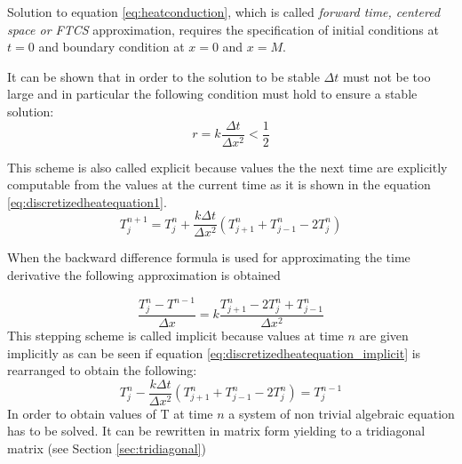 Solution to equation \ref{eq:heatconduction}, which is called \textit{forward time, centered space or FTCS} approximation, requires the specification of initial conditions at $t=0$ and boundary condition at $x=0$ and $x=M$.

It can be shown that in order to the solution to be stable $\Delta t$ must not be too large and in particular the following condition must hold to ensure a stable solution:
\[ 
 r= k \frac{\Delta t}{\Delta x^2}< \frac{1}{2}
\]

This scheme is also called explicit because values the the next time are explicitly computable from the values at the current time as it is shown in the equation \ref{eq:discretizedheatequation1}.
 \begin{equation}
  T^{n+1}_{j} = T^n_{j} + \frac{k \Delta t}{\Delta x^2} (T^n_{j+1}+T^n_{j-1}-2T^n_{j})
 \label{eq:discretizedheatequation1}
 \end{equation}

When the backward difference formula is used for approximating the time derivative the following approximation is obtained

 \begin{equation}
  \frac{T^{n}_{j} - T^{n-1}_{}}{\Delta x} = k \frac{T^n_{j+1}- 2T^n_{j} + T^n_{j-1}}{\Delta x^2}
 \label{eq:discretizedheatequation_implicit}
 \end{equation}
 This stepping scheme is called implicit because values at time $n$ are given implicitly as can be seen if equation \ref{eq:discretizedheatequation_implicit} is rearranged to obtain the following: 
 \begin{equation}
T^n_{j} - \frac{k \Delta t}{\Delta x^2} (T^n_{j+1}+T^n_{j-1}-2T^n_{j}) =   T^{n-1}_{j}
 \label{eq:discretizedheatequation1}
 \end{equation}
 In order to obtain values of T at time $n$ a system of non trivial algebraic equation has to be solved. 
 It can be rewritten in matrix form yielding to a tridiagonal matrix (see Section \ref{sec:tridiagonal})

